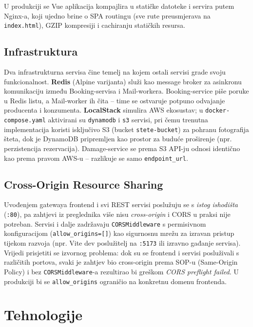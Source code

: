 \documentclass[12pt,a4paper]{article}
\begin{document}
U produkciji se Vue aplikacija kompajlira u statičke datoteke i servira putem Nginx-a, koji ujedno brine o SPA routingu (sve rute preusmjerava na \texttt{index.html}), GZIP kompresiji i cachiranju statičkih resursa.

\subsection{Infrastruktura}

Dva infrastrukturna servisa čine temelj na kojem ostali servisi grade svoju funkcionalnost. \textbf{Redis} (Alpine varijanta) služi kao message broker za asinkronu komunikaciju između Booking-servisa i Mail-workera. Booking-service piše poruke u Redis listu, a Mail-worker ih čita -- time se ostvaruje potpuno odvajanje producenta i konzumenta. \textbf{LocalStack} simulira AWS ekosustav; u \texttt{docker-compose.yaml} aktivirani su \texttt{dynamodb} i \texttt{s3} servisi, pri čemu trenutna implementacija koristi isključivo S3 (bucket \texttt{stete-bucket}) za pohranu fotografija šteta, dok je DynamoDB pripremljen kao prostor za buduće proširenje (npr. perzistencija rezervacija). Damage-service se prema S3 API-ju odnosi identično kao prema pravom AWS-u -- razlikuje se samo \texttt{endpoint\_url}.

\subsection{Cross-Origin Resource Sharing}

Uvođenjem gatewaya frontend i svi REST servisi poslužuju se s \emph{istog ishodišta} (\texttt{:80}), pa zahtjevi iz preglednika više nisu \emph{cross-origin} i CORS u praksi nije potreban. Servisi i dalje zadržavaju \texttt{CORSMiddleware} s permisivnom konfiguracijom (\texttt{allow\_origins=[\textquotedbl*\textquotedbl]}) kao sigurnosnu mrežu za izravan pristup tijekom razvoja (npr. Vite dev poslužitelj na \texttt{:5173} ili izravno gađanje servisa). Vrijedi prisjetiti se izvornog problema: dok su se frontend i servisi posluživali s različitih portova, svaki je zahtjev bio cross-origin prema SOP-u (Same-Origin Policy) i bez \texttt{CORSMiddleware}-a rezultirao bi greškom \emph{CORS preflight failed}. U produkciji bi se \texttt{allow\_origins} ograničio na konkretnu domenu frontenda.

\section{Tehnologije}
\end{document}
